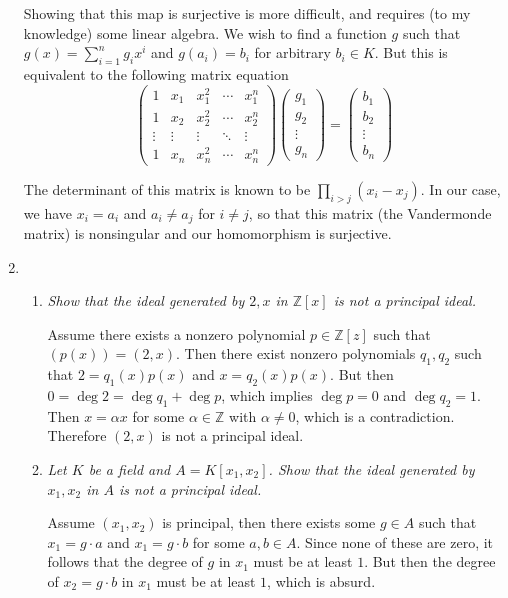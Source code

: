 \documentclass[10pt]{article}
\newcommand{\Z}{\mathbb{Z}}
\begin{document}
\begin{enumerate}
Showing that this map is surjective is more difficult, and requires (to my knowledge) some linear algebra.  We wish to find a function $g$ such that $g(x) = \sum_{i=1}^n g_i x^i$ and $g(a_i) = b_i$ for arbitrary $b_i \in K$.  But this is equivalent to the following matrix equation
\[
\left(
\begin{array}{ccccc} 
1 & x_1 & x_1^2 & \cdots & x_1^n \\
1 & x_2 & x_2^2 & \cdots & x_2^n  \\
\vdots & \vdots & \vdots & \ddots & \vdots  \\
1 & x_n & x_n^2 & \cdots & x_n^n 
\end{array}
\right)
\left(
\begin{array}{c}
g_1 \\ g_2 \\ \vdots \\ g_n
\end{array}
\right) = 
\left(
\begin{array}{c}
b_1 \\ b_2 \\ \vdots \\ b_n
\end{array}
\right)
\]

The determinant of this matrix is known to be $\prod_{i > j} (x_i - x_j)$.  In our case, we have $x_i = a_i$ and $a_i \neq a_j$ for $i \neq j$, so that this matrix (the Vandermonde matrix) is nonsingular and our homomorphism is surjective.

\item
\begin{enumerate}
\item \emph{Show that the ideal generated by ${2, x}$ in $\Z[x]$ is not a principal ideal.}

Assume there exists a nonzero polynomial $p \in \Z[z]$ such that $(p(x)) = (2,x)$.  Then there exist nonzero polynomials $q_1, q_2$ such that $2 = q_1(x)p(x)$ and $x = q_2(x)p(x)$.  But then $0 = \deg 2 = \deg q_1 + \deg p$, which implies $\deg p = 0$ and $\deg q_2 = 1$.  Then $x = \alpha x$ for some $\alpha \in \Z$ with $\alpha \neq 0$, which is a contradiction.  Therefore $(2,x)$ is not a principal ideal.

\item \emph{Let $K$ be a field and $A = K[x_1,x_2]$.  Show that the ideal generated by $x_1, x_2$ in $A$ is not a principal ideal.}

Assume $(x_1, x_2)$ is principal, then there exists some $g \in A$ such that $x_1 = g \cdot a$ and $x_1 = g \cdot b$ for some $a,b \in A$.  Since none of these are zero, it follows that the degree of $g$ in $x_1$ must be at least $1$.  But then the degree of $x_2 = g \cdot b$ in $x_1$ must be at least $1$, which is absurd.


\end{enumerate}
\end{enumerate}
\end{document}

